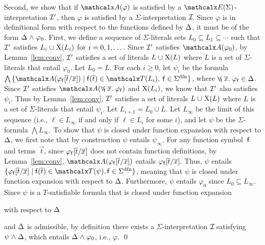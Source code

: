 \begin{proofsketch}
Second, we show that if $\conv( \varphi )$ is satisfied by a
$\extendsig{\Sigma}$-interpretation ${\mathcal{I}'}$, then $\varphi$ is satisfied by a
$\Sigma$-interpretation $\mathcal{I\!}$. Since $\varphi$ is in definitional form with
respect to the functions defined by $\DDD$, it must be of the form
$\DDD \wedge \varphi_0$.
First, we define a sequence of $\Sigma$-literals sets $L_0 \subseteq L_1 \subseteq \cdots$
such that ${\mathcal{I}'}$ satisfies $L_i \cup \absconstraints( L_i )$ for $i = 0, 1, \ldots\vthinspace$.
Since ${\mathcal{I}'}$ satisfies $\conv( \varphi_0 )$,
by Lemma~\ref{lem:conv},
${\mathcal{I}'}$ satisfies a set of literals $L \cup \absconstraints( L )$ where $L$ is a set of $\Sigma$-literals that entail $\varphi_0$.
Let $L_0 = L$.
For each $i \geq 0$,
let $\psi_i$ be the formula $\bigwedge\, \{ \conv( \varphi_{\con{f}}[ \vec t / \vec x ] ) \mid \con{f}( \vec t ) \in \terms( L_i ),\: \con{f} \in \sfundefs{\Sigma} \}$,
where $\forallf{\con{f}} \vec x.\; \varphi_{\con{f}} \in \DDD$.
Since ${\mathcal{I}'}$ satisfies $\conv( \forallf{\con{f}} \vec x.\; \varphi_{\con{f}} )$ and $\mathrm{X}( L_i )$,
we know that ${\mathcal{I}'}$ also satisfies $\psi_i$.
Thus by Lemma~\ref{lem:conv},
${\mathcal{I}'}$ satisfies a set of literals $L \cup \absconstraints( L )$ where $L$ is a set of $\Sigma$-literals that entail $\psi_i$.
Let $L_{i+1} = L_0 \cup L$.
Let $L_\infty$ be the limit of this sequence (i.e., $\ell \in L_\infty$ if and only if
$\ell \in L_i$ for some $i$),
and let $\psi$ be the $\Sigma$-formula $\bigwedge L_\infty$.
To show that $\psi$ is closed under function expansion with respect to $\DDD$,
we first note that by construction $\psi$ entails $\psi_\infty$.
For any function symbol~$\mathsf{f}$ and terms~$\vec t$, since $\varphi_{\mathsf{f}}[ \overline{t} / \overline{x} ]$ does not contain function definitions,
by Lemma~\ref{lem:conv},
$\conv( \varphi_{\con{f}}[ \vec t / \vec x ] )$ entails $\varphi_{\mathsf{f}}[ \overline{t} / \overline{x} ]$.
Thus, $\psi$ entails $\{ \varphi_{\con{f}}[ \vec t / \vec x ] \mid \con{f}( \vec t ) \in \terms( \psi ), \con{f} \in \sfundefs{\Sigma} \}$,
meaning that $\psi$ is closed under function expansion with respect to $\DDD$.
Furthermore, $\psi$ entails $\varphi_0$ since $L_0 \subseteq L_\infty$.
Since $\psi$ is a $T$-satisfiable formula that is closed under function expansion\begin{rep} with respect to $\DDD$\end{rep} and $\DDD$ is admissible,
by definition there exists a $\Sigma$-interpretation $\mathcal{I\!}$ satisfying $\psi \wedge \DDD$, which entails $\DDD \wedge \varphi_0$,
i.e., $\varphi$.
\qed
\end{proofsketch}

